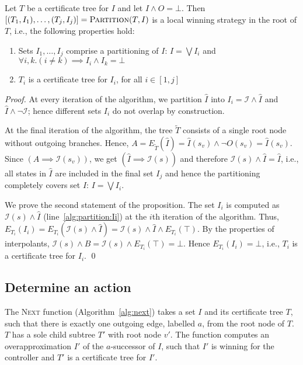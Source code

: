 \begin{proposition}\label{prop:partition}
    Let $T$ be a certificate tree for $I$ and let $I\land O =\bot$.  Then
    $[(T_1,I_1),\ldots,(T_j, I_j)] = \textsc{Partition}(T, I)$
    is a local winning strategy in the root of $T$, i.e., the
    following properties hold:
    \begin{enumerate}
        \item Sets $I_1,\ldots,I_j$ comprise a partitioning of
            $I$: $I=\bigvee I_i$ and $\forall i, k. (i\neq k)
            \implies I_i\land I_k=\bot$
        \item $T_i$ is a certificate tree for $I_i$, for all
            $i\in[1,j]$
    \end{enumerate}
\end{proposition}
\begin{proof}
    At every iteration of the algorithm, we partition $\hat{I}$
    into $I_i = \mathcal{I} \land\hat{I}$ and
    $\hat{I} \land \neg\mathcal{I}$; hence different sets $I_i$ do
    not overlap by construction.

    At the final iteration of the algorithm, the tree $\tilde{T}$
    consists of a single root node without outgoing branches.
    Hence, $A = E_{\tilde{T}}(\hat{I}) = \hat{I}(s_v) \land \neg O(s_v) =
    \hat{I}(s_v)$.  Since $(A\implies \mathcal{I}(s_v))$, we get $(\hat{I} \implies \mathcal{I}(s))$
    and therefore $\mathcal{I}(s) \land \hat{I} = \hat{I}$, i.e., all
    states in $\hat{I}$ are included in the final set $I_j$ and hence
    the partitioning completely covers set $I$: $I=\bigvee I_i$.

    We prove the second statement of the proposition.  The set $I_i$ is computed as
    $\mathcal{I}(s) \land \hat{I}$ (line~\ref{alg:partition:Ii}) at the $i$th iteration of the algorithm.
    Thus, $E_{T_i}(I_i) = E_{T_i}(\mathcal{I}(s) \land \hat{I}) = \mathcal{I}(s) \land \hat{I} \land E_{T_i}(\top)$.
    By the properties of interpolants, $\mathcal{I}(s) \land B = \mathcal{I}(s) \land E_{T_i}(\top) = \bot$.
    Hence $E_{T_i}(I_i) = \bot$, i.e., $T_i$ is a certificate tree for $I_i$.
    \qed
\end{proof}

\subsection{Determine an action}

The \textsc{Next} function (Algorithm~\ref{alg:next}) takes a set $I$ and its certificate tree $T$, such
that there is exactly one outgoing edge, labelled $a$, from the root node of $T$.
$T$ has a sole child subtree $T'$ with root node $v'$.
The function computes an overapproximation $I'$ of the $a$-successor of $I$,
such that $I'$ is winning for the controller and $T'$ is a certificate tree for $I'$.

